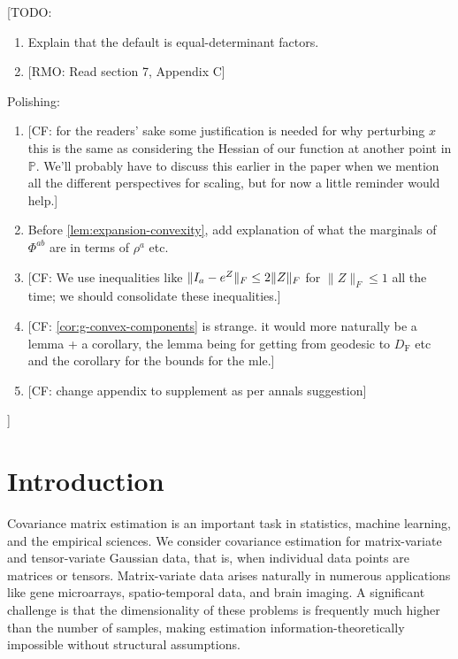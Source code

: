 \documentclass[aos]{imsart}
\theoremstyle{definition}
\numberwithin{equation}{section}
\DeclarePairedDelimiter{\norm}{\lVert}{\rVert}
\newcommand{\eps}{\varepsilon}
\newcommand{\SPD}{\mathbb{P}}
\newcommand{\samp}{x}
\newcommand{\DF}{D_{\operatorname{F}}}
\newcommand{\CF}[1]{{\color{purple}[CF: #1]}}
\newcommand{\AR}[1]{{\color{orange}[AR: #1]}}
\newcommand{\RMO}[1]{{\color{olive}[RMO: #1]}}
\newcommand{\TODO}[1]{{\color{blue}[TODO: #1]}}
\newcommand{\CF}[1]{{}}
\newcommand{\AR}[1]{{}}
\newcommand{\RMO}[1]{{}}
\newcommand{\TODO}[1]{{}}
\begin{document}
\TODO{
\begin{enumerate}
\item Explain that the default is equal-determinant factors.
\item \RMO{Read section 7, Appendix C}
\end{enumerate}
Polishing:
\begin{enumerate}
\item \CF{for the readers' sake some justification is needed for why perturbing $\samp$ this is the same as considering the Hessian of our function at another point in $\SPD$. We'll probably have to discuss this earlier in the paper when we mention all the different perspectives for scaling, but for now a little reminder would help.}
\item Before \cref{lem:expansion-convexity}, add explanation of what the marginals of $\Phi^{ab}$ are in terms of $\rho^{a}$ etc.
\item \CF{We use inequalities like $\norm{I_a - e^{Z}}_F
\leq 2 \norm{Z}_F$ for $\|Z\|_F \leq 1$ all the time; we should consolidate these inequalities.}
\item \CF{\cref{cor:g-convex-components} is strange. it would more naturally be a lemma + a corollary, the lemma being for getting from geodesic to $\DF$ etc and the corollary for the bounds for the mle.}
\item \CF{change appendix to supplement as per annals suggestion}
\end{enumerate}
}


\section{Introduction}
Covariance matrix estimation is an important task in statistics, machine learning, and the empirical sciences.
We consider covariance estimation for matrix-variate and tensor-variate Gaussian data, that is, when individual data points are matrices or tensors. Matrix-variate data arises naturally in numerous applications like gene microarrays, spatio-temporal data, and brain imaging.
A significant challenge is that the dimensionality of these problems is frequently much higher than the number of samples, making estimation information-theoretically impossible without structural assumptions.
\end{document}
